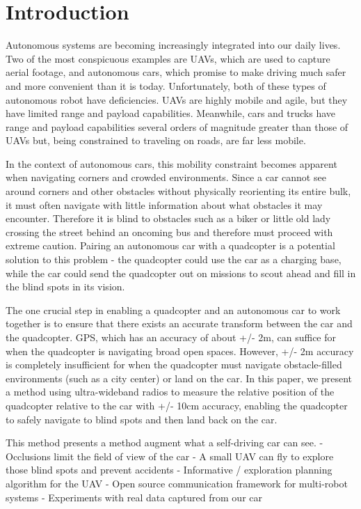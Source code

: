 
\section{Introduction}

Autonomous systems are becoming increasingly integrated into
our daily lives. Two of the most conspicuous examples are UAVs,
which are used to capture aerial footage, and autonomous cars,
which promise to make driving much safer and more convenient
than it is today. Unfortunately, both of these types of autonomous
robot have deficiencies. UAVs are highly mobile and agile, but they
have limited range and payload capabilities. Meanwhile, cars and trucks
have range and payload capabilities several orders of magnitude greater than
those of UAVs but, being constrained to traveling on roads, are far less mobile.

In the context of autonomous cars, this mobility constraint becomes apparent
when navigating corners and crowded environments. Since a car cannot
see around corners and other obstacles without physically reorienting its
entire bulk, it must often navigate with little information about what obstacles
it may encounter. Therefore it is blind to obstacles such as a biker or little old
lady crossing the street behind an oncoming bus and therefore must proceed
with extreme caution. Pairing an autonomous car with a quadcopter is a potential
solution to this problem - the quadcopter could use the car as a charging base,
while the car could send the quadcopter out on missions to scout ahead and
fill in the blind spots in its vision.

The one crucial step in enabling a quadcopter and an autonomous car to work
together is to ensure that there exists an accurate transform between the car
and the quadcopter. GPS, which has an accuracy of about +/- 2m, can suffice
for when the quadcopter is navigating broad open spaces. However, +/- 2m
accuracy is completely insufficient for when the quadcopter must navigate
obstacle-filled environments (such as a city center) or land on the car. In this 
paper, we present a method using ultra-wideband radios to measure the relative 
position of the quadcopter relative to the car with +/- 10cm accuracy, enabling 
the quadcopter to safely navigate to blind spots and then land back on the car.

This method presents a method augment what a self-driving car can see.
- Occlusions limit the field of view of the car
- A small UAV can fly to explore those blind spots and prevent accidents
- Informative / exploration planning algorithm for the UAV
- Open source communication framework for multi-robot systems
- Experiments with real data captured from our car 

